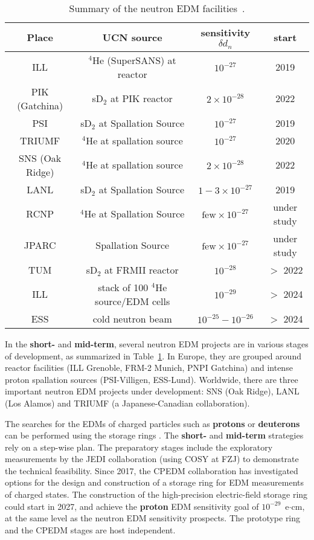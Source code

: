 \setlength{\tabcolsep}{4pt}
\begin{table}
\caption{Summary of the neutron EDM facilities~\cite{PaulESPP19}.}
\label{tab: EDM_status}
\scriptsize
 \begin{center}
 \begin{tabular}{cccc}
\hline\hline
 Place & UCN source & sensitivity $\delta d_n$& start\\ \hline
 ILL &  $^4$He (SuperSANS) at reactor & $10^{-27}$ &2019\\
PIK (Gatchina) & sD$_2$ at PIK reactor  & $2 \times 10^{-28}$ & 2022\\
PSI& sD$_2$ at Spallation Source & $10^{-27}$ &2019\\
TRIUMF &$^4$He at spallation source & $10^{-27}$ &2020\\
SNS (Oak Ridge) &$^4$He at spallation source &
     $2 \times 10^{-28}$ & 2022\\
LANL & sD$_2$ at Spallation Source   &$1-3 \times 10^{-27}$ & 2019\\
RCNP & $^4$He at Spallation Source & $\text{few} \times 10^{-27}$ & under study\\
JPARC & Spallation Source&  $\text{few} \times 10^{-27}$& under study\\
TUM&sD$_2$ at FRMII reactor &$10^{-28}$& $>$ 2022\\
ILL& stack of 100 $^4$He source/EDM cells & $10^{-29}$ &  $>$ 2024\\
ESS& cold neutron beam & $10^{-25}-10^{-26}$ & $>$ 2024\\
    \hline\hline
       \end{tabular}
\end{center}
\end{table}
\setlength{\tabcolsep}{6pt}



In the {\bf short-} and  {\bf mid-term},  several  neutron EDM projects are in  various stages  of  development, as summarized in  Table~\ref{tab: EDM_status}. 
In Europe, they are grouped around reactor facilities (ILL Grenoble, FRM-2 Munich, PNPI Gatchina)  and  intense  proton  spallation  sources  (PSI-Villigen,  ESS-Lund). 
Worldwide, there are three
important neutron EDM projects under development: 
SNS (Oak Ridge), LANL (Los Alamos) and TRIUMF (a  Japanese-Canadian collaboration).




The searches for the EDMs  of  charged  particles  such  as  {\bf protons} or  {\bf deuterons}  can  be  performed using  the  storage  rings \cite{Anastassopoulos:2015ura}. The {\bf short-} and  {\bf mid-term} strategies rely on a step-wise plan. 
The preparatory stages include the exploratory  measurements by the JEDI collaboration
\cite{Jedi_exp} (using COSY at FZJ) to demonstrate the technical feasibility. 
Since 2017, the CPEDM collaboration \cite{Rathmann:2019vtb} has investigated options for the design and construction of a storage ring for  
EDM measurements of charged states. 
The construction of the high-precision
electric-field storage ring could start in 2027, 
and achieve the {\bf proton} EDM sensitivity goal of $10^{-29}$~e$\cdot$cm, at the same level as the neutron EDM sensitivity prospects. 
The prototype ring and the CPEDM stages are host independent.


